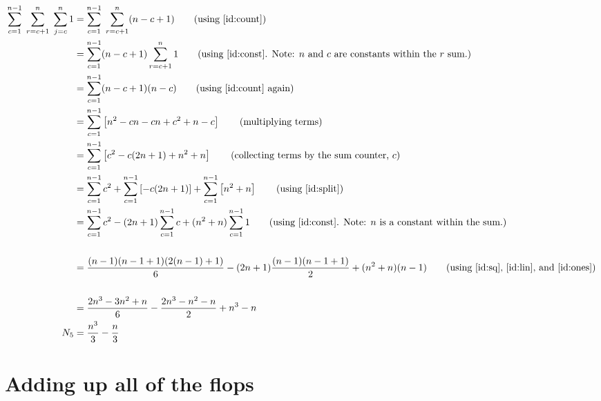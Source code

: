 \documentclass[11pt]{article}
\begin{document}
\begin{align}
    \sum_{c=1}^{n-1} \; \sum_{r=c+1}^{n} \; \sum_{j=c}^{n} 1 &= \sum_{c=1}^{n-1} \; \sum_{r=c+1}^{n} (n - c + 1) \tag{using \ref{id:count}} \\
                                                             &= \sum_{c=1}^{n-1} (n - c + 1) \sum_{r=c+1}^{n} 1 \tag{using \ref{id:const}. Note: $n$ and $c$ are constants within the $r$ sum.} \\
                                                             &= \sum_{c=1}^{n-1} (n - c + 1)(n - c) \tag{using \ref{id:count} again} \\
                                                             &= \sum_{c=1}^{n-1} \left[ n^2 - cn - cn + c^2 + n - c \right] \tag{multiplying terms}\\
                                                             &= \sum_{c=1}^{n-1} \left[ c^2 - c(2n+1) + n^2 + n \right] \tag{collecting terms by the sum counter, $c$} \\
                                                             &= \sum_{c=1}^{n-1} c^2 + \sum_{c=1}^{n-1} \left[ - c(2n+1) \right] + \sum_{c=1}^{n-1} \left[ n^2 + n \right] \tag{using \ref{id:split}}\\
                                                             &= \sum_{c=1}^{n-1} c^2 - (2n+1) \sum_{c=1}^{n-1} c + (n^2 + n) \sum_{c=1}^{n-1} 1  \tag{using \ref{id:const}. Note: $n$ is a constant within the sum.}\\
                                                             \notag\\
                                                             &= \frac{(n-1)(n-1+1)(2(n-1) + 1)}{6} - (2n+1) \frac{(n-1)(n-1+1)}{2} + (n^2 + n)(n-1)
                                                             \tag{using \ref{id:sq}, \ref{id:lin}, and \ref{id:ones}} \\
                                                             \notag\\
                                                             &= \frac{2n^3 - 3n^2 + n}{6} - \frac{2n^3 - n^2 - n}{2} + n^3-n \notag\\
    N_5 &= \frac{n^3}{3} - \frac{n}{3} \notag
\end{align}

\section{Adding up all of the flops}
\end{document}
